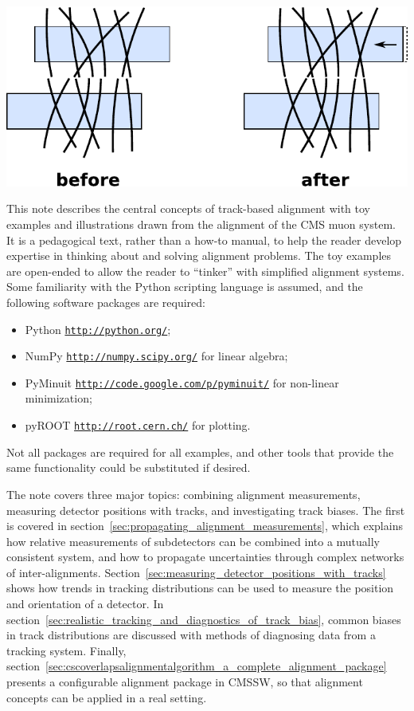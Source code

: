\documentclass[12pt]{article}
\begin{document}
\begin{center}
\includegraphics[width=0.6\linewidth]{PLOTS/alignment_with_tracks.pdf}
\end{center}

This note describes the central concepts of track-based alignment with
toy examples and illustrations drawn from the alignment of the CMS muon
system.  It is a pedagogical text, rather than a how-to manual, to
help the reader develop expertise in thinking about and solving
alignment problems.  The toy examples are open-ended to allow the
reader to ``tinker'' with simplified alignment systems.  Some
familiarity with the Python scripting language is assumed, and the
following software packages are required:
\begin{itemize}
\item Python \href{http://python.org/}{\tt http://python.org/};
\item NumPy \href{http://numpy.scipy.org/}{\tt http://numpy.scipy.org/} for linear algebra;
\item PyMinuit \href{http://code.google.com/p/pyminuit/}{\tt http://code.google.com/p/pyminuit/} for non-linear
  minimization;
\item pyROOT \href{http://root.cern.ch/}{\tt http://root.cern.ch/} for plotting.
\end{itemize}
Not all packages are required for all examples, and other tools that
provide the same functionality could be substituted if desired.

The note covers three major topics: combining alignment measurements,
measuring detector positions with tracks, and investigating track
biases.  The first is covered in
section~\ref{sec:propagating_alignment_measurements}, which explains
how relative measurements of subdetectors can be combined into a
mutually consistent system, and how to propagate uncertainties through
complex networks of inter-alignments.
Section~\ref{sec:measuring_detector_positions_with_tracks} shows how
trends in tracking distributions can be used to measure the position
and orientation of a detector.  In
section~\ref{sec:realistic_tracking_and_diagnostics_of_track_bias},
common biases in track distributions are discussed with methods of
diagnosing data from a tracking system.  Finally,
section~\ref{sec:cscoverlapsalignmentalgorithm_a_complete_alignment_package}
presents a configurable alignment package in CMSSW, so that alignment
concepts can be applied in a real setting.
\end{document}
